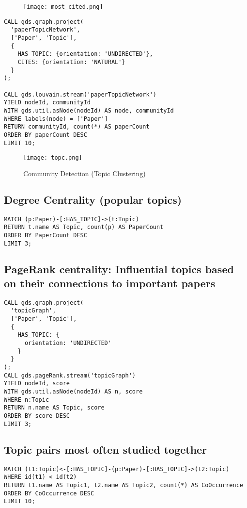 \documentclass{article}
\theoremstyle{mytheoremstyle}
\theoremstyle{mytheoremstyle}
\theoremstyle{myproblemstyle}
\begin{document}
\begin{figure}[h!]
    \centering
    \texttt{[image: most\_cited.png]}
    \label{fig:enter-label}
\end{figure}


\begin{lstlisting}[style=cypherstyle]
CALL gds.graph.project(
  'paperTopicNetwork',
  ['Paper', 'Topic'],
  {
    HAS_TOPIC: {orientation: 'UNDIRECTED'},
    CITES: {orientation: 'NATURAL'}
  }
);

CALL gds.louvain.stream('paperTopicNetwork')
YIELD nodeId, communityId
WITH gds.util.asNode(nodeId) AS node, communityId
WHERE labels(node) = ['Paper']
RETURN communityId, count(*) AS paperCount
ORDER BY paperCount DESC
LIMIT 10;
\end{lstlisting}

\begin{figure}[h!]
    \centering
    \texttt{[image: topc.png]}
    \caption{Community Detection (Topic Clustering)}
    \label{fig:enter-label}
\end{figure}

\subsection{Degree Centrality (popular topics)}
\begin{lstlisting}[style=cypherstyle]
MATCH (p:Paper)-[:HAS_TOPIC]->(t:Topic) 
RETURN t.name AS Topic, count(p) AS PaperCount 
ORDER BY PaperCount DESC 
LIMIT 3; 
\end{lstlisting}

\subsection{PageRank centrality: Influential topics based on their connections to important papers}
\begin{lstlisting}[style=cypherstyle]
CALL gds.graph.project( 
  'topicGraph', 
  ['Paper', 'Topic'], 
  { 
    HAS_TOPIC: { 
      orientation: 'UNDIRECTED' 
    } 
  } 
); 
CALL gds.pageRank.stream('topicGraph') 
YIELD nodeId, score 
WITH gds.util.asNode(nodeId) AS n, score 
WHERE n:Topic 
RETURN n.name AS Topic, score 
ORDER BY score DESC 
LIMIT 3;  
\end{lstlisting}

\subsection{Topic pairs most often studied together}
\begin{lstlisting}[style=cypherstyle]
MATCH (t1:Topic)<-[:HAS_TOPIC]-(p:Paper)-[:HAS_TOPIC]->(t2:Topic) 
WHERE id(t1) < id(t2) 
RETURN t1.name AS Topic1, t2.name AS Topic2, count(*) AS CoOccurrence 
ORDER BY CoOccurrence DESC 
LIMIT 10;   
\end{lstlisting}
\end{document}
